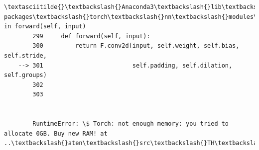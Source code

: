 \documentclass[11pt]{article}
\begin{document}
\begin{Verbatim}[commandchars=\\\{\}]
        \textasciitilde{}\textbackslash{}Anaconda3\textbackslash{}lib\textbackslash{}site-packages\textbackslash{}torch\textbackslash{}nn\textbackslash{}modules\textbackslash{}conv.py in forward(self, input)
        299     def forward(self, input):
        300         return F.conv2d(input, self.weight, self.bias, self.stride,
    --> 301                         self.padding, self.dilation, self.groups)
        302 
        303 
    

        RuntimeError: \$ Torch: not enough memory: you tried to allocate 0GB. Buy new RAM! at ..\textbackslash{}aten\textbackslash{}src\textbackslash{}TH\textbackslash{}THGeneral.cpp:204

    \end{Verbatim}


    
    
    
    
\end{document}
